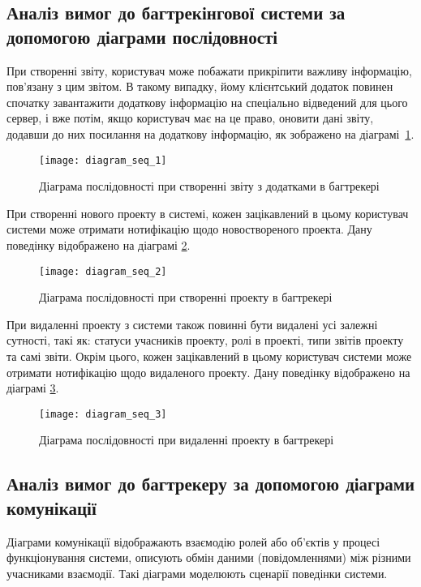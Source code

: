 \documentclass[../main.tex]{subfiles}
\begin{document}
	\subsection{Аналіз вимог до багтрекінгової системи за допомогою діаграми послідовності}
		При створенні звіту, користувач може побажати прикріпити важливу інформацію, пов'язану з цим звітом. В такому випадку, йому клієнтський додаток повинен спочатку завантажити додаткову інформацію на спеціально відведений для цього сервер, і вже потім, якщо користувач має на це право, оновити дані звіту, додавши до них посилання на додаткову інформацію, як зображено на діаграмі~\ref{figure_diag_seq_1}.
		
		\begin{figure}[H]
			\centering
			\texttt{[image: diagram\_seq\_1]}
			\caption{Діаграма послідовності при створенні звіту з додатками в багтрекері}
			\label{figure_diag_seq_1}
		\end{figure}
	
		При створенні нового проекту в системі, кожен зацікавлений в цьому користувач системи може отримати нотифікацію щодо новоствореного проекта. Дану поведінку відображено на діаграмі \ref{figure_diag_seq_2}.
		
		\begin{figure}[H]
			\centering
			\texttt{[image: diagram\_seq\_2]}
			\caption{Діаграма послідовності при створенні проекту в багтрекері}
			\label{figure_diag_seq_2}
		\end{figure}
	
		При видаленні проекту з системи також повинні бути видалені усі залежні сутності, такі як: статуси учасників проекту, ролі в проекті, типи звітів проекту та самі звіти. Окрім цього, кожен зацікавлений в цьому користувач системи може отримати нотифікацію щодо видаленого проекту. Дану поведінку відображено на діаграмі \ref{figure_diag_seq_3}.
	
		\begin{figure}[H]
			\centering
			\texttt{[image: diagram\_seq\_3]}
			\caption{Діаграма послідовності при видаленні проекту в багтрекері}
			\label{figure_diag_seq_3}
		\end{figure}
	
	\subsection{Аналіз вимог до багтрекеру за допомогою діаграми комунікації}
		Діаграми комунікації відображають взаємодію ролей або об'єктів у процесі функціонування системи, описують обмін даними (повідомленнями) між різними учасниками взаємодії. Такі діаграми моделюють сценарії поведінки системи.~\cite{chnu_designing_systems}
		
\end{document}
